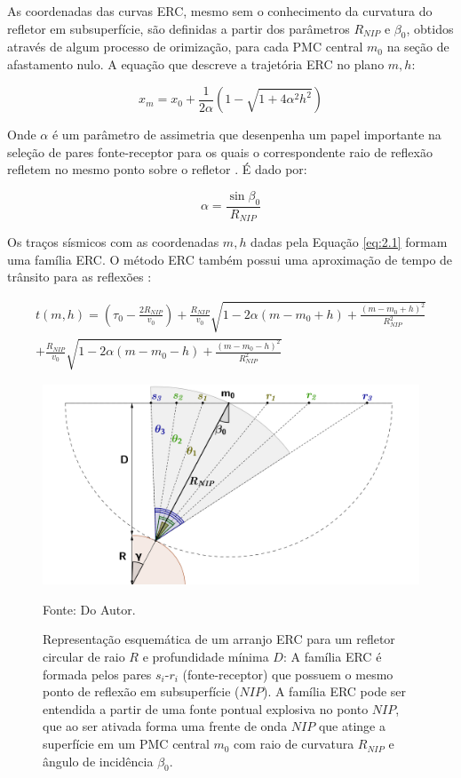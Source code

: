 As coordenadas das curvas ERC, mesmo sem o conhecimento da curvatura do refletor em subsuperfície, são definidas
a partir dos parâmetros $R_{NIP}$ e $\beta_0$, obtidos através de algum processo de orimização, 
para cada PMC central $m_0$ na seção de afastamento nulo. A equação que descreve a trajetória ERC no plano $m,h$:

\begin{equation}
 \label{eq:2.1}
 x_m= x_0 + \frac{1}{2\alpha} (1-\sqrt{1+4\alpha^2h^2})
\end{equation}


Onde $\alpha$ é um parâmetro de assimetria que desenpenha um papel importante na seleção de pares fonte-receptor para os quais
o correspondente raio de reflexão refletem no mesmo ponto sobre o refletor \cite{tygel}. É dado por:

\begin{equation}
\label{eq:2.2}
 \alpha=\frac{\sin{\beta_0}}{R_{NIP}}
\end{equation}

Os traços sísmicos com as coordenadas $m,h$ dadas pela Equação \ref{eq:2.1} formam uma família ERC.
O método ERC também possui uma aproximação de tempo de trânsito para
as reflexões \cite{cre}:

\begin{multline}
\label{eq:2.3}
t(m,h)=(\tau_0-\frac{2R_{NIP}}{v_0})+\frac{R_{NIP}}{v_0}\sqrt{1-2\alpha(m-m_0+h)+\frac{(m-m_0+h)^2}{R_{NIP}^2}} \\
+\frac{R_{NIP}}{v_0}\sqrt{1-2\alpha(m-m_0-h)+\frac{(m-m_0-h)^2}{R_{NIP}^2}}
\end{multline}

\begin{figure}[H]
\caption{Representação esquemática de um arranjo ERC para um refletor circular de raio $R$ e profundidade
mínima $D$: A família ERC é formada pelos pares $s_i$-$r_i$ (fonte-receptor) que possuem o mesmo ponto de
reflexão em subsuperfície ($NIP$). A família ERC pode ser entendida a partir de uma fonte pontual explosiva
no ponto $NIP$, que ao ser ativada forma uma frente de onda $NIP$ que atinge a superfície em um PMC central 
$m_0$ com raio de curvatura $R_{NIP}$ e ângulo de incidência $\beta_0$.}
\begin{center}
\includegraphics[scale=0.3]{images/cre.png}
\vspace{-0.3cm}
\end{center}
\begin{center}
 Fonte: Do Autor.
\end{center}
\label{fig:2.1}
\end{figure}

